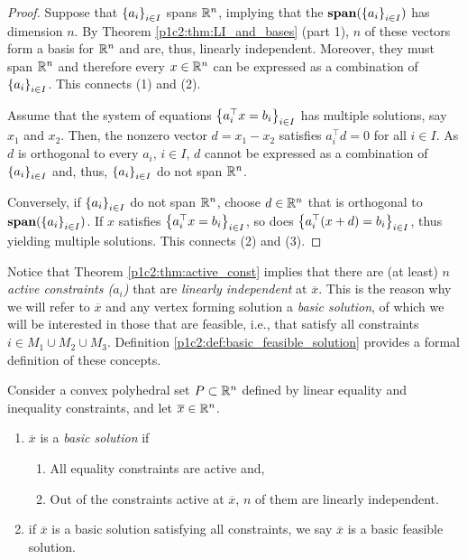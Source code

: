 \begin{proof}
	Suppose that $\left\{ a_i \right \}_{i \in I}$ spans $\mathbb{R}^n$, implying that the $\mathop{\bf span}(\left\{ a_i \right \}_{i \in I})$ has dimension $n$. By Theorem \ref{p1c2:thm:LI_and_bases} (part 1), $n$ of these vectors form a basis for $\mathbb{R}^n$ and are, thus, linearly independent. Moreover, they must span $\mathbb{R}^n$ and therefore every $x \in \mathbb{R}^n$ can be expressed as a combination of $\left\{ a_i \right \}_{i \in I}$. This connects (1) and (2).
	
	Assume that the system of equations $\left\{ a_i ^\top x = b_i \right \}_{i \in I}$ has multiple solutions, say $x_1$ and $x_2$. Then, the nonzero vector $d = x_1 - x_2$ satisfies $a_i^\top d = 0$ for all $i \in I$. As $d$ is orthogonal to every $a_i$, $i \in I$, $d$ cannot be expressed as a combination of $\left\{ a_i \right \}_{i \in I}$ and, thus, $\left\{ a_i \right \}_{i \in I}$ do not span $\mathbb{R}^n$.
	
	Conversely, if $\left\{ a_i \right \}_{i \in I}$ do not span $\mathbb{R}^n$, choose $d \in \mathbb{R}^n$ that is orthogonal to $\mathop{\bf span}(\left\{ a_i \right \}_{i \in I})$. If $x$ satisfies $\left\{ a_i ^\top x = b_i \right \}_{i \in I}$, so does $\left\{ a_i ^\top (x + d) = b_i \right \}_{i \in I}$, thus yielding multiple solutions. This connects (2) and (3). \qedhere
\end{proof}

Notice that Theorem \ref{p1c2:thm:active_const} implies that there are (at least) \emph{$n$ active constraints ($a_i$)} that are \emph{linearly independent} at $\overline{x}$. This is the reason why we will refer to $\overline{x}$ and any vertex forming solution a \emph{basic solution}, of which we will be interested in those that are feasible, i.e., that satisfy all constraints $i \in M_1 \cup M_2 \cup M_3$. Definition \ref{p1c2:def:basic_feasible_solution} provides a formal definition of these concepts.

\begin{definition} \label{p1c2:def:basic_feasible_solution}
	Consider a convex polyhedral set $P \subset \mathbb{R}^n$ defined by linear equality and inequality constraints, and let $\overline{x} \in \mathbb{R}^n$.
	\begin{enumerate}
		\item $\overline{x}$ is a \emph{basic solution} if 
		\begin{enumerate}
			\item All equality constraints are active and,
			\item Out of the constraints active at $\overline{x}$, $n$ of them are linearly independent.
		\end{enumerate}
		\item if $\overline{x}$  is a basic solution satisfying all constraints, we say $\overline{x}$ is a basic feasible solution. 
	\end{enumerate}
\end{definition}

